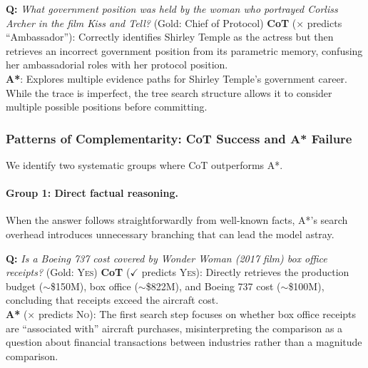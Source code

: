 \documentclass[11pt]{article}
\begin{document}
\begin{examplebox}[title=HotpotQA --- Multi-hop Chaining]
\textbf{Q:} \emph{What government position was held by the woman who portrayed Corliss Archer in the film Kiss and Tell?} \quad (Gold: Chief of Protocol)
\tcblower
\textbf{CoT} ($\times$ predicts ``Ambassador''): Correctly identifies Shirley Temple as the actress but then retrieves an incorrect government position from its parametric memory, confusing her ambassadorial roles with her protocol position.\\[4pt]
\textbf{A*}: Explores multiple evidence paths for Shirley Temple's government career. While the trace is imperfect, the tree search structure allows it to consider multiple possible positions before committing.
\end{examplebox}

\subsubsection{Patterns of Complementarity: CoT Success and A* Failure}
\label{sec:cot_success}

We identify two systematic groups where CoT outperforms A*.

\paragraph{Group 1: Direct factual reasoning.} When the answer follows straightforwardly from well-known facts, A*'s search overhead introduces unnecessary branching that can lead the model astray.

\begin{examplebox}[title=StrategyQA --- Direct Factual Reasoning]
\textbf{Q:} \emph{Is a Boeing 737 cost covered by Wonder Woman (2017 film) box office receipts?} \quad (Gold: \textsc{Yes})
\tcblower
\textbf{CoT} ($\checkmark$ predicts \textsc{Yes}): Directly retrieves the production budget ($\sim$\$150M), box office ($\sim$\$822M), and Boeing 737 cost ($\sim$\$100M), concluding that receipts exceed the aircraft cost.\\[4pt]
\textbf{A*} ($\times$ predicts \textsc{No}): The first search step focuses on whether box office receipts are ``associated with'' aircraft purchases, misinterpreting the comparison as a question about financial transactions between industries rather than a magnitude comparison.
\end{examplebox}
\end{document}
